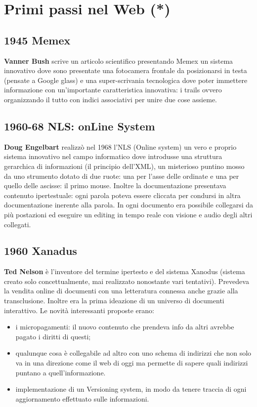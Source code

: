 

\chapter{Primi passi nel Web (*)}
	
	\section{1945 Memex}
		\textbf{Vanner Bush} scrive un articolo scientifico presentando Memex un sistema innovativo dove sono presentate una fotocamera frontale da posizionarsi in testa (pensate a Google glass) e una super-scrivania tecnologica dove poter immettere informazione con un’importante caratteristica innovativa: i trails ovvero organizzando il tutto con indici associativi per unire due cose assieme.
		
		
	\section{1960-68 NLS: onLine System}
		\textbf{Doug Engelbart} realizzò nel 1968 l'NLS (Online system) un vero e proprio sistema innovativo nel campo informatico dove introdusse una struttura gerarchica di informazioni (il principio dell'XML), un misterioso puntino mosso da uno strumento dotato di due ruote: una per l'asse delle ordinate e una per quello delle ascisse: il primo mouse. Inoltre la documentazione presentava contenuto ipertestuale: ogni parola poteva essere cliccata per condursi in altra documentazione inerente alla parola. In ogni documento era possibile collegarsi da più postazioni ed eseguire un editing in tempo reale con visione e audio degli altri collegati.
		
	\section{1960 Xanadus}
		\textbf{Ted Nelson} è l'inventore del termine ipertesto e del sistema Xanodus (sistema creato solo concettualmente, mai realizzato nonostante vari tentativi). Prevedeva la vendita online di documenti con una letteratura connessa anche grazie alla transclusione. Inoltre era la prima ideazione di un universo di documenti interattivo.
		Le novità interessanti proposte erano:
		\begin{itemize}
			\item i micropagamenti: il nuovo contenuto che prendeva info da altri avrebbe pagato i diritti di questi;
			\item qualunque cosa è collegabile ad altro con uno schema di indirizzi che non solo va in una direzione come il web di oggi ma permette di sapere quali indirizzi puntano a quell'informazione.
			\item implementazione di un Versioning system, in modo da tenere traccia di ogni aggiornamento effettuato sulle informazioni.
		\end{itemize}
		

